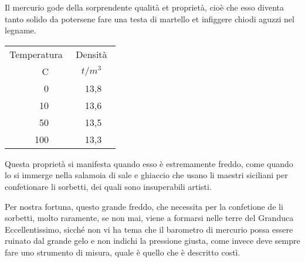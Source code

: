 Il mercurio gode della sorprendente qualit\`a et propriet\`a, cio\`e che esso
diventa tanto solido da potersene fare una testa di martello et infiggere
chiodi aguzzi nel legname.
\begin{table}[htp]              %
	\centering                      %
	\begin{tabular}%
		{rrrrrr}                        %
		\hline\hline                    %
		\multicolumn{3}{c}{\rule{0pt}{2.5ex}Temperatura} %
		& \multicolumn{3}{c}{Densit\`a} \\               %
		&\unit{\gradi C} & & & $\unit{t/m^3}$ &  \\
		\hline%
		\hspace*{1.3em}& 0  &  & & 13,8 &  \\   %
		& 10  &  & & 13,6 &  \\   %
		& 50  &  & & 13,5 &  \\   %
		&100  &  & & 13,3 &  \\   %
		\hline \hline                           %
	\end{tabular}
\end{table}


\begin{osservazione}\normalfont
	Questa propriet\`a si manifesta quando esso \`e estremamente freddo, come
	quando lo si immerge nella salamoia di sale e ghiaccio che usano li maestri
	siciliani per confetionare li sorbetti, dei quali sono insuperabili artisti.
\end{osservazione}

Per nostra fortuna, questo grande freddo, che necessita per la confetione de
li sorbetti, molto raramente, se non mai, viene a formarsi nelle terre del
Granduca Eccellentissimo, sicch\'e non vi ha tema che il barometro di mercurio
possa essere ruinato dal grande gelo e non indichi la pressione giusta, come
invece deve sempre fare uno strumento di misura, quale \`e quello che \`e
descritto cost\`i.\cite{duane1964}

